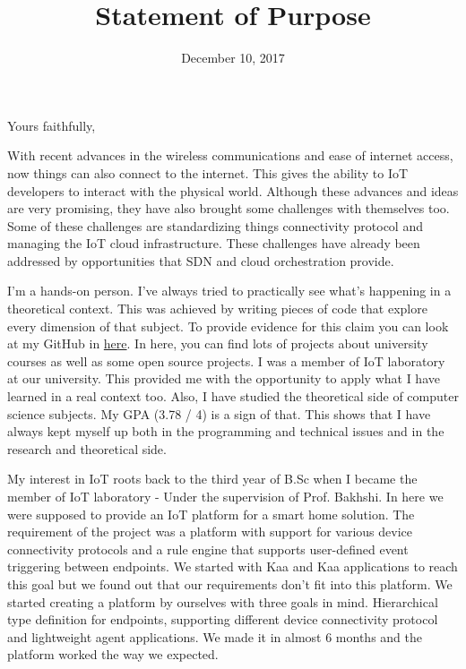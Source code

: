 \documentclass[11pt,a4paper,sans]{moderncv}        %
\title{Statement of Purpose}                               %
\begin{document}
\date{December 10, 2017}
\opening{}
\closing{Yours faithfully,}

\makelettertitle


With recent advances in the wireless communications and ease of internet access,
now things can also connect to the internet. This gives the ability to IoT
developers to interact with the physical world. Although these advances and ideas
are very promising, they have also brought some challenges with themselves too.
Some of these challenges are standardizing things connectivity protocol and
managing the IoT cloud infrastructure. These challenges have already been addressed by
opportunities that SDN and cloud orchestration provide.

I'm a hands-on person. I've always tried to practically see what's happening
in a theoretical context. This was achieved by writing pieces of code that explore
every dimension of that subject. To provide evidence for this claim you can
look at my GitHub in \href{https://github.com/Tabrizian}{here}. In
here, you can find lots of projects about university courses as well as some
open source projects. I was a member of IoT laboratory at our university. This
provided me with the opportunity to apply what I have learned in a real context too.
Also, I have studied the theoretical side of computer science subjects.
My GPA (3.78 / 4) is a sign of that. This shows that I have always kept
myself up both in the programming and technical issues and in the research and
theoretical side.

My interest in IoT roots back to the third year of B.Sc when I became the member
of IoT laboratory - Under the supervision of Prof. Bakhshi.
In here we were supposed to provide an IoT platform for
a smart home solution. The requirement of the project was a platform with
support for various device connectivity protocols and a rule engine that
supports user-defined event triggering between endpoints. We started with Kaa
and Kaa applications to reach this goal but we found out that our requirements
don't fit into this platform. We started creating a platform by ourselves
with three goals in mind. Hierarchical type definition for endpoints,
supporting different device connectivity protocol and lightweight
agent applications. We made it in almost 6 months and the platform worked the
way we expected.
\end{document}
